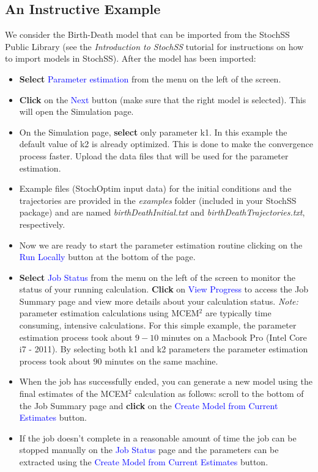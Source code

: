 \documentclass[12pt,notitlepage,nofootinbib]{revtex4}
\begin{document}
\subsection{An Instructive Example}
We consider the Birth-Death model that can be imported from the StochSS Public Library (see the \textit{Introduction to StochSS} tutorial for instructions on how to import models in StochSS).
After the model has been imported:
\begin{itemize}
\item \textbf{Select} \textcolor{blue}{Parameter estimation} from the menu on the left of the screen.
\item \textbf{Click} on the \textcolor{blue}{Next} button (make sure that the right model is selected). This will open the Simulation page.
\item On the Simulation page, \textbf{select} only parameter k1. In this example the default value of k2 is already optimized. This is done to make the convergence process faster. Upload the data files that will be used for the parameter estimation.
\item Example files (StochOptim input data) for the initial conditions and the trajectories are provided in the \textit{examples} folder (included in your StochSS package) and are named \textit{birthDeathInitial.txt} and \textit{birthDeathTrajectories.txt}, respectively.
\item Now we are ready to start the parameter estimation routine clicking on the \textcolor{blue}{Run Locally} button at the bottom of the page. 
\item \textbf{Select} \textcolor{blue}{Job Status} from the menu on the left of the screen to monitor the status of your running calculation.
\textbf{Click} on  \textcolor{blue}{View Progress} to access the Job Summary page and view more details about your calculation status. \textit{Note:} parameter estimation calculations using MCEM$^2$ are typically time consuming, intensive calculations. For this simple example, the parameter estimation process took about $9-10$ minutes on a Macbook Pro (Intel Core i7 - 2011). By selecting both k1 and k2 parameters the parameter estimation process took about $90$ minutes on the same machine.

\item When the job has successfully ended, you can generate a new model using the final estimates of the MCEM$^2$ calculation as follows: scroll to the bottom of the Job Summary page and \textbf{click} on the \textcolor{blue}{Create Model from Current Estimates} button. 
\item If the job doesn't complete in a reasonable amount of time the job can be stopped manually on the \textcolor{blue}{Job Status} page and the parameters can be extracted using the \textcolor{blue}{Create Model from Current Estimates} button.
\end{itemize}
\end{document}
